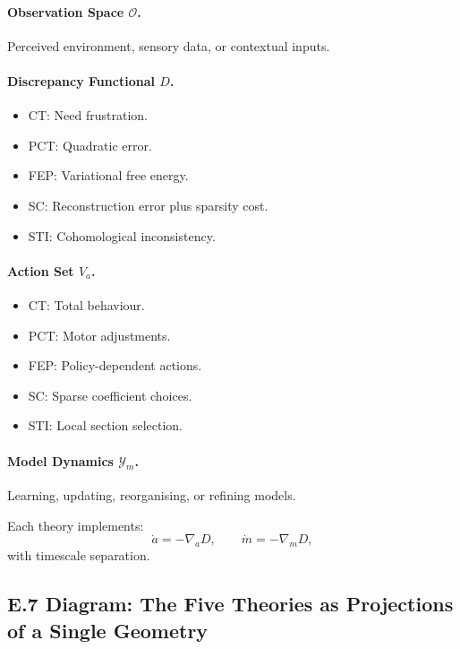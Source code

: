\documentclass[11pt,a4paper,twoside]{article}
\begin{document}
\paragraph{Observation Space $\mathcal{O}$.}
Perceived environment, sensory data, or contextual inputs.

\paragraph{Discrepancy Functional $D$.}
\begin{itemize}
\item CT: Need frustration.
\item PCT: Quadratic error.
\item FEP: Variational free energy.
\item SC: Reconstruction error plus sparsity cost.
\item STI: Cohomological inconsistency.
\end{itemize}

\paragraph{Action Set $V_{\!a}$.}
\begin{itemize}
\item CT: Total behaviour.
\item PCT: Motor adjustments.
\item FEP: Policy-dependent actions.
\item SC: Sparse coefficient choices.
\item STI: Local section selection.
\end{itemize}

\paragraph{Model Dynamics $\mathcal{Y}_m$.}
Learning, updating, reorganising, or refining models.

Each theory implements:
\[
\dot{a} = -\nabla_a D,
\qquad
\dot{m} = -\nabla_m D,
\]
with timescale separation.

\subsection*{E.7 Diagram: The Five Theories as Projections of a Single Geometry}
\end{document}
